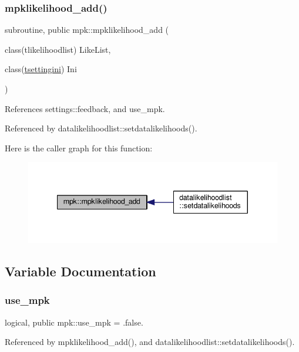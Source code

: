 \subsubsection{\texorpdfstring{mpklikelihood\+\_\+add()}{mpklikelihood\_add()}}
{\footnotesize\ttfamily subroutine, public mpk\+::mpklikelihood\+\_\+add (\begin{DoxyParamCaption}\item[{class(tlikelihoodlist)}]{Like\+List,  }\item[{class(\mbox{\hyperlink{structsettings_1_1tsettingini}{tsettingini}})}]{Ini }\end{DoxyParamCaption})}



References settings\+::feedback, and use\+\_\+mpk.



Referenced by datalikelihoodlist\+::setdatalikelihoods().

Here is the caller graph for this function\+:
\nopagebreak
\begin{figure}[H]
\begin{center}
\leavevmode
\includegraphics[width=340pt]{namespacempk_ae7cb8b283f9de4deefe99581fac85c0a_icgraph}
\end{center}
\end{figure}


\subsection{Variable Documentation}
\mbox{\label{namespacempk_adf47eff3dde9016dbf1a2749db2ec13f}} 
\subsubsection{\texorpdfstring{use\+\_\+mpk}{use\_mpk}}
{\footnotesize\ttfamily logical, public mpk\+::use\+\_\+mpk = .false.}



Referenced by mpklikelihood\+\_\+add(), and datalikelihoodlist\+::setdatalikelihoods().

